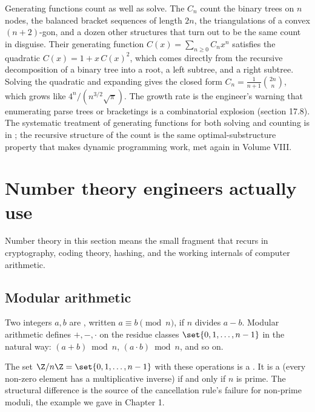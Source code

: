 \begin{mastery}
Generating functions count as well as solve. The
 $C_{n}$ count the binary trees on $n$
nodes, the balanced bracket sequences of length $2n$, the
triangulations of a convex $(n+2)$-gon, and a dozen other structures
that turn out to be the same count in disguise. Their generating
function $C(x) = \sum_{n \geq 0} C_{n} x^{n}$ satisfies the
quadratic $C(x) = 1 + x\, C(x)^{2}$, which comes directly from the
recursive decomposition of a binary tree into a root, a left
subtree, and a right subtree. Solving the quadratic and expanding
gives the closed form $C_{n} = \frac{1}{n+1}\binom{2n}{n}$, which
grows like $4^{n}/(n^{3/2}\sqrt{\pi})$. The growth rate is the
engineer's warning that enumerating parse trees or bracketings is a
combinatorial explosion (section 17.8). The systematic treatment of
generating functions for both solving and counting is in
\textcite{text:v2ch17-graham-knuth-patashnik}; the recursive
structure of the count is the same optimal-substructure property
that makes dynamic programming work, met again in Volume VIII.
\end{mastery}

\section{Number theory engineers actually use}

Number theory in this section means the small fragment that
recurs in cryptography, coding theory, hashing, and the working
internals of computer arithmetic.

\subsection{Modular arithmetic}

Two integers $a, b$ are , written $a
\equiv b \pmod{n}$, if $n$ divides $a - b$. Modular arithmetic
defines $+, -, \cdot$ on the residue classes $\set{0, 1, \ldots, n
- 1}$ in the natural way: $(a + b) \bmod n$, $(a \cdot b) \bmod n$,
and so on.

The set $\Z/n\Z = \set{0, 1, \ldots, n-1}$ with these operations is
a . It is a  (every
non-zero element has a multiplicative inverse) if and only if $n$
is prime. The structural difference is the source of the
cancellation rule's failure for non-prime moduli, the example we
gave in Chapter 1.

